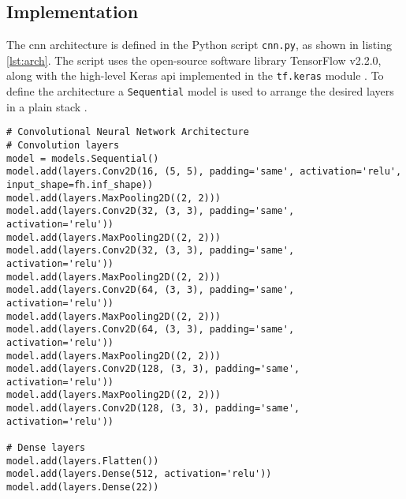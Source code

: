 \subsection{Implementation}
\label{subsec:training_of_the_cnn:architecture:implementation}
The \acrshort{cnn} architecture is defined in the Python script \texttt{cnn.py}, as shown in listing \ref{lst:arch}.
The script uses the open-source software library TensorFlow v2.2.0, along with the high-level Keras \acrshort{api} implemented in the \texttt{tf.keras} module \cite{}. %
To define the architecture a \texttt{Sequential} model is used to arrange the desired layers in a plain stack \cite{}. %

\begin{lstlisting}[style=python, caption={Sequential model}, label=lst:arch]
# Convolutional Neural Network Architecture
# Convolution layers
model = models.Sequential()
model.add(layers.Conv2D(16, (5, 5), padding='same', activation='relu', input_shape=fh.inf_shape))
model.add(layers.MaxPooling2D((2, 2)))
model.add(layers.Conv2D(32, (3, 3), padding='same', activation='relu'))
model.add(layers.MaxPooling2D((2, 2)))
model.add(layers.Conv2D(32, (3, 3), padding='same', activation='relu'))
model.add(layers.MaxPooling2D((2, 2)))
model.add(layers.Conv2D(64, (3, 3), padding='same', activation='relu'))
model.add(layers.MaxPooling2D((2, 2)))
model.add(layers.Conv2D(64, (3, 3), padding='same', activation='relu'))
model.add(layers.MaxPooling2D((2, 2)))
model.add(layers.Conv2D(128, (3, 3), padding='same', activation='relu'))
model.add(layers.MaxPooling2D((2, 2)))
model.add(layers.Conv2D(128, (3, 3), padding='same', activation='relu'))

# Dense layers
model.add(layers.Flatten())
model.add(layers.Dense(512, activation='relu'))
model.add(layers.Dense(22))
\end{lstlisting}
